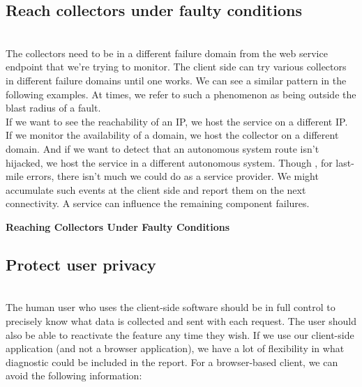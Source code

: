 \subsection{Reach collectors under faulty conditions}\label{qIVax57WJ1MO2otJunSvy}
\\
The collectors need to be in a different failure domain from the web service endpoint that we're trying to monitor. The client side can try various collectors in different failure domains until one works. We can see a similar pattern in the following examples. At times, we refer to such a phenomenon as being outside the blast radius of a fault.
\\
If we want to see the reachability of an IP, we host the service on a different IP. If we monitor the availability of a domain, we host the collector on a different domain. And if we want to detect that an autonomous system route isn't hijacked, we host the service in a different autonomous system. Though , for last-mile errors, there isn't much we could do as a service provider. We might accumulate such events at the client side and report them on the next connectivity. A service can influence the remaining component failures.

\textbf{Reaching Collectors Under Faulty Conditions}

\begin{table}[htbp]
\centering
\small
{}
\caption{Reaching Collectors Under Faulty Conditions}
\end{table}

\subsection{Protect user privacy}\label{CWk0msdJ3vwbIutNMhFyd}
\\
The human user who uses the client-side software should be in full control to precisely know what data is collected and sent with each request. The user should also be able to reactivate the feature any time they wish. If we use our client-side application (and not a browser application), we have a lot of flexibility in what diagnostic could be included in the report. For a browser-based client, we can avoid the following information:

